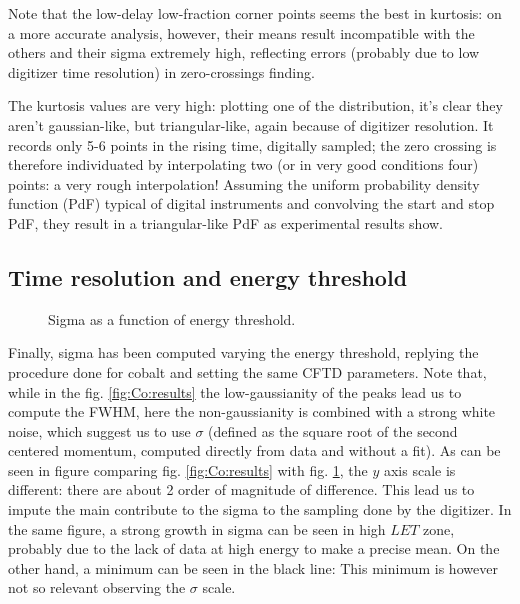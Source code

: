 \documentclass[11pt,a4 paper]{article}
\begin{document}
Note that the low-delay low-fraction corner points seems the best in kurtosis: on a more accurate analysis, however, their means result incompatible with the others and their sigma extremely high, reflecting errors (probably due to low digitizer time resolution) in zero-crossings finding.

The kurtosis values are very high: plotting one of the distribution, it's clear they aren't gaussian-like, but triangular-like, again because of digitizer resolution. It records only 5-6 points in the rising time, digitally sampled; the zero crossing is therefore individuated by interpolating two (or in very good conditions four) points: a very rough interpolation! Assuming the uniform probability density function (PdF) typical of digital instruments and convolving the start and stop PdF, they result in a triangular-like PdF as experimental results show.

\subsection{Time resolution and energy threshold}

\begin{figure}[H]
    \centering
    \caption{Sigma as a function of energy threshold.}
    \label{fig:sigma:sim}
\end{figure}


Finally, sigma has been computed varying the energy threshold, replying the procedure done for cobalt and setting the same CFTD parameters. Note that, while in the fig. \ref{fig:Co:results} the low-gaussianity of the peaks lead us to compute the FWHM, here the non-gaussianity is combined with a strong white noise, which suggest us to use $\sigma$ (defined as the square root of the second centered momentum, computed directly from data and without a fit). As can be seen in figure comparing fig. \ref{fig:Co:results} with fig. \ref{fig:sigma:sim}, the $y$ axis scale is different: there are about 2 order of magnitude of difference. This lead us to impute the main contribute to the sigma to the sampling done by the digitizer. In the same figure, a strong growth in sigma can be seen in high $LET$ zone, probably due to the lack of data at high energy to make a precise mean. On the other hand, a minimum can be seen in the black line: This minimum is however not so relevant observing the $\sigma$ scale.
\end{document}
